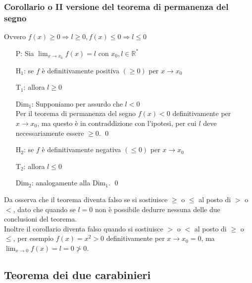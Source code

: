 \documentclass[a4paper]{article}
\begin{document}
\subsubsection*{Corollario o II versione del teorema di permanenza del segno}
Ovvero \(f(x) \geq 0 \Rightarrow l \geq 0, f(x) \leq 0 \Rightarrow l \leq 0\)
\begin{itemize}
	\item[P:] Sia \(\displaystyle \lim_{x \to x_0} f(x) = l\) con \(x_0, l \in \mathbb{R}^*\)
	\item[H\(_1\):] se \(f\) è definitivamente positiva \(\left( \geq 0 \right)\) per \(x \to x_0\)
	\item[T\(_1\):] allora \(l \geq 0\)
	\item[Dim\(_1\):] Supponiamo per assurdo che \(l < 0\) \\
	Per il teorema di permanenza del segno \(f(x) < 0\) definitivamente per \(x \to x_0\), ma questo è in contraddizione con l'ipotesi,
	per cui \(l\) deve necessariamente essere \(\geq 0\). \qed

	\item[H\(_2\):] se \(f\) è definitivamente negativa \(\left( \leq 0 \right)\) per \(x \to x_0\)
	\item[T\(_2\):] allora \(l \leq 0\)
	\item[Dim\(_2\):] analogamente alla Dim\(_1\). \qed
\end{itemize}
Da osserva che il teorema diventa falso se si sostiuisce \(\geq\) o \(\leq\) al posto di \(>\) o \(<\), dato che quando se \(l = 0\) non è possibile dedurre nessuna delle due conclusioni del teorema. \\
Inoltre il corollario diventa falso quando si sostiuisce \(>\) o \(<\) al posto di \(\geq\) o \(\leq\), per esempio \(f(x) = x^2 > 0\) definitivamente per \(x \to x_0 = 0\), ma \(\displaystyle \lim_{x \to 0} f(x) = l = 0 \ngtr 0\).

\newpage


\subsection{Teorema dei due carabinieri}
\end{document}

